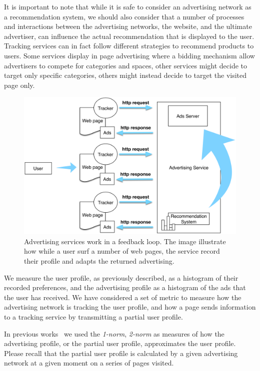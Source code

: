 It is important to note that while it is safe to consider an advertising network as a recommendation system, we should also consider that a number of processes and interactions between the advertising networks, the website, and the ultimate advertiser, can influence the actual recommendation that is displayed to the user. Tracking services can in fact follow different strategies to recommend products to users. Some services display in page advertising where a bidding mechanism allow advertisers to compete for categories and spaces, other services might decide to target only specific categories, others might instead decide to target the visited page only.

\begin{figure}
\includegraphics[width=\textwidth]{figures/advertising-loop.png}
\caption[Advertising services feedback loop]{Advertising services work in a feedback loop. The image illustrate how while a user surf a number of web pages, the service record their profile and adapts the returned advertising.
\label{fig:advertising-loop}}
\end{figure}

We measure the user profile, as previously described, as a histogram of their recorded preferences, and the advertising profile as a histogram of the ads that the user has received. We have considered a set of metric to measure how the advertising network is tracking the user profile, and how a page sends information to a tracking service by transmitting a partial user profile.

In previous works\cite{puglisi2016web}~\cite{puglisi2015you} we used the \emph{1-norm}, \emph{2-norm} as measures of how the advertising profile, or the partial user profile, approximates the user profile. Please recall that the partial user profile is calculated by a given advertising network at a given moment on a series of pages visited.

